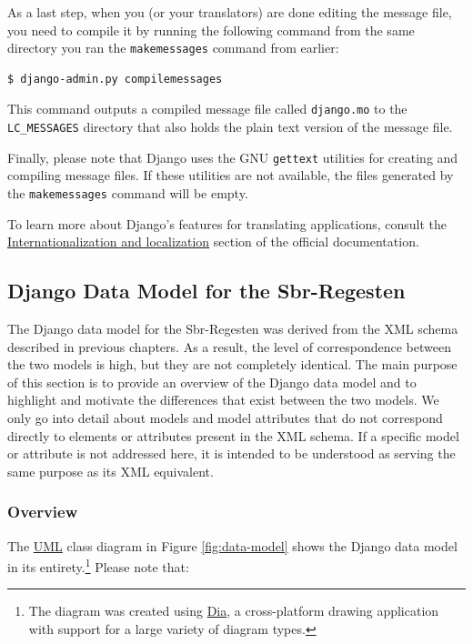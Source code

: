 As a last step, when you (or your translators) are done editing the
message file, you need to compile it by running the following command
from the same directory you ran the \texttt{makemessages} command from
earlier:

\begin{verbatim}
$ django-admin.py compilemessages
\end{verbatim}

This command outputs a compiled message file called \texttt{django.mo}
to the \texttt{LC\_MESSAGES} directory that also holds the plain text
version of the message file.

Finally, please note that Django uses the GNU \texttt{gettext}
utilities for creating and compiling message files. If these utilities
are not available, the files generated by the \texttt{makemessages}
command will be empty.

To learn more about Django's features for translating applications,
consult the
\href{https://docs.djangoproject.com/en/1.4/topics/i18n/}{Internationalization
  and localization} section of the official documentation.

\subsection{Django Data Model for the Sbr-Regesten}
\label{sec:data-model}

The Django data model for the Sbr-Regesten was derived from the XML
schema described in previous chapters. As a result, the level of
correspondence between the two models is high, but they are not
completely identical. The main purpose of this section is to provide
an overview of the Django data model and to highlight and motivate the
differences that exist between the two models. We only go into detail
about models and model attributes that do not correspond directly to
elements or attributes present in the XML schema. If a specific model
or attribute is not addressed here, it is intended to be understood as
serving the same purpose as its XML equivalent.

\subsubsection{Overview}
\label{sec:model-overview}

The
\href{https://en.wikipedia.org/wiki/Unified_Modeling_Language}{UML}
class diagram in Figure \ref{fig:data-model} shows the Django data
model in its entirety.\footnote{The diagram was created using
  \href{http://projects.gnome.org/dia/}{Dia}, a cross-platform drawing
  application with support for a large variety of diagram types.}
Please note that:

